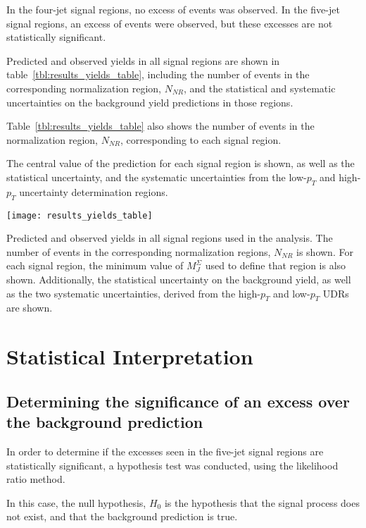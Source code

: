 In the four-jet signal regions, no excess of events was observed.
In the five-jet signal regions, an excess of events were observed, but these excesses are not statistically
significant.

Predicted and observed yields in all signal regions are shown in table~\ref{tbl:results_yields_table},
including the number of events in the corresponding normalization region, $N_{NR}$, and the statistical and systematic
uncertainties on the background yield predictions in those regions.

Table~\ref{tbl:results_yields_table} also shows the number of events in the normalization region, $N_{NR}$,
corresponding to each signal region.

The central value of the prediction for each signal region is shown, as well as the statistical uncertainty,
and the systematic uncertainties from the low-$p_T$ and high-$p_T$ uncertainty determination regions.

\begin{table}[!ht]
    \centering
\texttt{[image: results\_yields\_table]}
\caption{Predicted and observed yields in all signal regions used in the analysis.
The number of events in the corresponding normalization regions, $N_{NR}$ is shown.
For each signal region, the minimum value of $M_J^{\Sigma}$ used to define that region is also shown.
Additionally, the statistical uncertainty on the background yield, as well as the two systematic uncertainties,
derived from the high-$p_T$ and low-$p_T$ UDRs are shown.}
\label{tbl:results_yields_table}
\end{table}

\section{Statistical Interpretation}\label{sec:results_stats}

\subsection{Determining the significance of an excess over the background prediction}\label{subsec:results_stats_excess}
In order to determine if the excesses seen in the five-jet signal regions are statistically significant,
a hypothesis test was conducted, using the likelihood ratio method\cite{results-stats-asymptotic}.

In this case, the null hypothesis, $H_0$ is the hypothesis that the signal process does not exist, and that the
background prediction is true.

